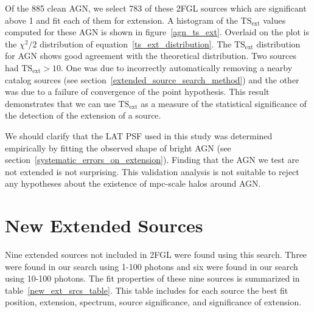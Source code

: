 \documentclass[12pt,preprint]{aastex}
\newcommand{\gev}{\text{GeV}\xspace}
\newcommand{\tsext}{{\ensuremath{\text{TS}_{\text{ext}}}}\xspace}
\begin{document}
Of the 885 clean AGN, we select 783 of these 2FGL sources which
are significant above 1 \gev and fit each of them for extension.
A histogram of the \tsext values computed for these AGN is
shown in figure~\ref{agn_ts_ext}. Overlaid on the plot is the
$\chi^2/2$ distribution of equation~\ref{ts_ext_distribution}.
The \tsext distribution for AGN shows good agreement with the
theoretical distribution.  Two sources had $\tsext>10$.  One was due
to incorrectly automatically removing a nearby catalog sources (see
section~\ref{extended_source_search_method}) and the other was due to a
failure of convergence of the point hypothesis.  This result demonstrates
that we can use \tsext as a measure of the statistical significance of
the detection of the extension of a source.

We should clarify that the LAT PSF used in this study was determined
empirically by fitting the observed shape of bright AGN (see
section~\ref{systematic_errors_on_extension}). Finding that the AGN we
test are not extended is not surprising.  This validation analysis is
not suitable to reject any hypotheses about the existence of mpc-scale
halos around AGN.

\section{New Extended Sources}
\label{new_ext_srcs_section}



Nine extended sources not included in 2FGL were found using this search.
Three were found in our search using 1-100 \gev photons and six were
found in our search using 10-100 \gev photons.  The fit properties of
these nine sources is summarized in table~\ref{new_ext_srcs_table}.
This table includes for each source the best fit position, extension,
spectrum, source significance, and significance of extension.
\end{document}
